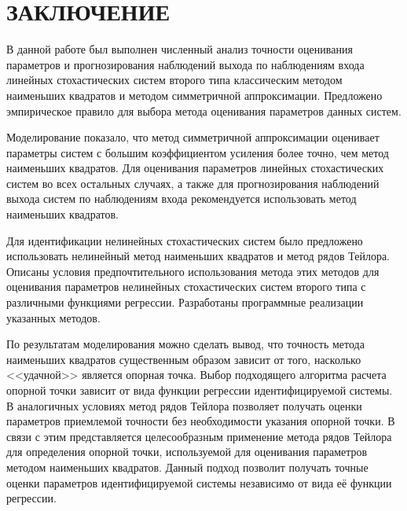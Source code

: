 \chapter*{ЗАКЛЮЧЕНИЕ}

В данной работе был выполнен численный анализ точности оценивания параметров и прогнозирования
наблюдений выхода по наблюдениям входа линейных стохастических систем второго типа
классическим методом наименьших квадратов и методом симметричной аппроксимации.
Предложено эмпирическое правило для выбора метода оценивания параметров данных систем.

Моделирование показало, что метод симметричной аппроксимации оценивает параметры систем
с большим коэффициентом усиления более точно, чем метод наименьших квадратов.
Для оценивания параметров линейных стохастических систем во всех остальных случаях,
а также для прогнозирования наблюдений выхода систем по наблюдениям входа
рекомендуется использовать метод наименьших квадратов.

Для идентификации нелинейных стохастических систем было предложено
использовать нелинейный метод наименьших квадратов и метод рядов Тейлора.
Описаны условия предпочтительного использования метода этих методов
для оценивания параметров нелинейных стохастических систем
второго типа с различными функциями регрессии.
Разработаны программные реализации указанных методов.

По результатам моделирования можно сделать вывод,
что точность метода наименьших квадратов существенным образом
зависит от того, насколько <<удачной>> является опорная точка.
Выбор подходящего алгоритма расчета опорной точки зависит от вида функции
регрессии идентифицируемой системы.
В аналогичных условиях метод рядов Тейлора позволяет получать оценки параметров
приемлемой точности без необходимости указания опорной точки.
В связи с этим представляется целесообразным применение метода рядов Тейлора
для определения опорной точки, используемой для оценивания параметров методом
наименьших квадратов.
Данный подход позволит получать точные оценки параметров идентифицируемой системы
независимо от вида её функции регрессии.
